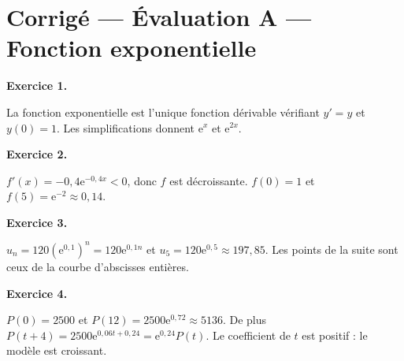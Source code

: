 \section*{Corrigé — Évaluation A — Fonction exponentielle}
\textbf{Exercice 1.}

La fonction exponentielle est l'unique fonction dérivable vérifiant $y'=y$ et $y(0)=1$. Les simplifications donnent $\mathrm{e}^{x}$ et $\mathrm{e}^{2x}$.

\textbf{Exercice 2.}

$f'(x)=-0{,}4\mathrm{e}^{-0{,}4x}<0$, donc $f$ est décroissante. $f(0)=1$ et $f(5)=\mathrm{e}^{-2}\approx0{,}14$.

\textbf{Exercice 3.}

$u_n=120(\mathrm{e}^{0{,}1})^n=120\mathrm{e}^{0{,}1n}$ et $u_5=120\mathrm{e}^{0{,}5}\approx197{,}85$. Les points de la suite sont ceux de la courbe d'abscisses entières.

\textbf{Exercice 4.}

$P(0)=2500$ et $P(12)=2500\mathrm{e}^{0{,}72}\approx5136$. De plus $P(t+4)=2500\mathrm{e}^{0{,}06t+0{,}24}=\mathrm{e}^{0{,}24}P(t)$. Le coefficient de $t$ est positif : le modèle est croissant.

